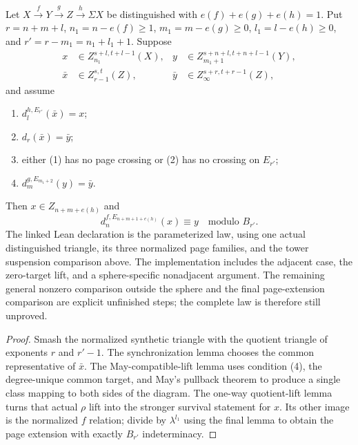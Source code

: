\begin{theorem}
  \label{thm:generalized-mahowald}
  \notready
  Let
  $X\xrightarrow fY\xrightarrow gZ\xrightarrow h\Sigma X$ be distinguished
  with $e(f)+e(g)+e(h)=1$.  Put
  $r=n+m+l$, $n_1=n-e(f)\ge1$,
  $m_1=m-e(g)\ge0$, $l_1=l-e(h)\ge0$, and
  $r'=r-m_1=n_1+l_1+1$.  Suppose
  \[
  \begin{aligned}
    x&\in Z_{n_1}^{s+l,t+l-1}(X),&
    y&\in Z_{m_1+1}^{s+n+l,t+n+l-1}(Y),\\
    \bar x&\in Z_{r-1}^{s,t}(Z),&
    \bar y&\in Z_\infty^{s+r,t+r-1}(Z),
  \end{aligned}
  \]
  and assume
  \begin{enumerate}
    \item $d_l^{h,E_{r'}}(\bar x)=x$;
    \item $d_r(\bar x)=\bar y$;
    \item either (1) has no page crossing or (2) has no crossing on $E_{r'}$;
    \item $d_m^{g,E_{m_1+2}}(y)=\bar y$.
  \end{enumerate}
  Then $x\in Z_{n+m+e(h)}$ and
  \[
    d_n^{f,E_{n+m+1+e(h)}}(x)
       \equiv y\quad\text{modulo }B_{r'}.
  \]
  The linked Lean declaration is the parameterized law, using one actual
  distinguished triangle, its three normalized page families, and the
  tower suspension comparison above. The implementation includes the
  adjacent case, the zero-target lift, and a sphere-specific nonadjacent
  argument. The remaining general nonzero comparison outside the sphere
  and the final page-extension comparison are explicit unfinished steps;
  the complete law is therefore still unproved.
\end{theorem}

\begin{proof}
  Smash the normalized synthetic triangle with the quotient triangle of
  exponents $r$ and $r'-1$.  The synchronization lemma chooses the common
  representative of $\bar x$.  The May-compatible-lift lemma uses condition
  (4), the degree-unique common target, and May's pullback theorem to produce a
  single class mapping to both sides of the diagram.  The one-way
  quotient-lift lemma turns that actual $\rho$ lift into the stronger survival
  statement for $x$.  Its other image is the normalized $f$ relation; divide
  by $\lambda^{l_1}$ using the final lemma to obtain the page extension with
  exactly $B_{r'}$ indeterminacy.
\end{proof}

